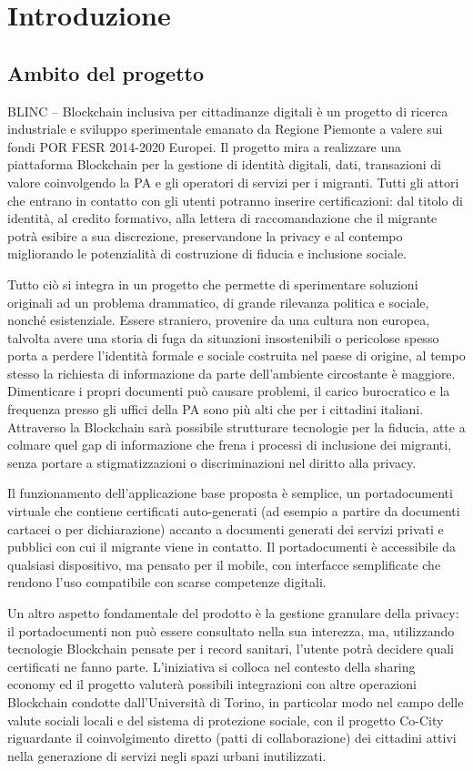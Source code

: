 \chapter{Introduzione}

\section{Ambito del progetto}
BLINC – Blockchain inclusiva per cittadinanze digitali è un progetto di ricerca industriale e sviluppo sperimentale emanato da Regione Piemonte
a valere sui fondi POR FESR 2014-2020 Europei. Il progetto mira a realizzare una piattaforma Blockchain per la gestione di identità digitali,
dati, transazioni di valore coinvolgendo la PA e gli operatori di servizi per i migranti.
Tutti gli attori che entrano in contatto con gli utenti potranno inserire certificazioni:
dal titolo di identità, al credito formativo, alla lettera di raccomandazione che il migrante
potrà esibire a sua discrezione, preservandone la privacy e al contempo migliorando le potenzialità di costruzione di fiducia e inclusione sociale.

Tutto ciò si integra in un progetto che permette di sperimentare soluzioni originali ad
un problema drammatico, di grande rilevanza politica e sociale, nonché esistenziale.
Essere straniero, provenire da una cultura non europea, talvolta avere una storia di fuga da situazioni insostenibili
o pericolose spesso porta a perdere l’identità formale e sociale costruita nel paese di origine, al tempo stesso la richiesta
di informazione da parte dell’ambiente circostante è maggiore. Dimenticare i propri documenti può causare problemi,
il carico burocratico e la frequenza presso gli uffici della PA sono più alti che per i cittadini italiani.
Attraverso la Blockchain sarà possibile strutturare tecnologie per la fiducia, atte a colmare quel gap di informazione che frena
i processi di inclusione dei migranti, senza portare a stigmatizzazioni o discriminazioni nel diritto alla privacy.

Il funzionamento dell’applicazione base proposta è semplice, un portadocumenti virtuale che contiene certificati auto-generati 
(ad esempio a partire da documenti cartacei o per dichiarazione) accanto a documenti generati dei servizi privati e pubblici con cui il migrante viene in contatto.
Il portadocumenti è accessibile da qualsiasi dispositivo, ma pensato per il mobile, con interfacce semplificate che rendono
l’uso compatibile con scarse competenze digitali.

Un altro aspetto fondamentale del prodotto è la gestione granulare della privacy: il portadocumenti non può essere consultato
nella sua interezza, ma, utilizzando tecnologie Blockchain pensate per i record sanitari, l’utente potrà decidere quali certificati ne fanno parte.
L’iniziativa si colloca nel contesto della sharing economy ed il progetto valuterà possibili integrazioni con altre operazioni Blockchain
condotte dall’Università di Torino, in particolar modo nel campo delle valute sociali locali e del sistema di protezione sociale,
con il progetto Co-City riguardante il coinvolgimento diretto (patti di collaborazione) dei cittadini attivi nella generazione di servizi negli spazi urbani inutilizzati.

